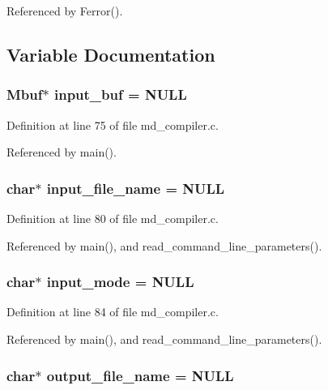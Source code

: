 Referenced by Ferror().

\subsection{Variable Documentation}
\subsubsection{\setlength{\rightskip}{0pt plus 5cm}\bf{Mbuf}$\ast$ \bf{input\_\-buf} = \bf{NULL}}\label{md__compiler_8c_25678326d4f061f5d3e7640b7981d682}




Definition at line 75 of file md\_\-compiler.c.

Referenced by main().
\subsubsection{\setlength{\rightskip}{0pt plus 5cm}char$\ast$ \bf{input\_\-file\_\-name} = \bf{NULL}}\label{md__compiler_8c_a91ff4ee3ee60baee9c097d4da3e3d18}




Definition at line 80 of file md\_\-compiler.c.

Referenced by main(), and read\_\-command\_\-line\_\-parameters().
\subsubsection{\setlength{\rightskip}{0pt plus 5cm}char$\ast$ \bf{input\_\-mode} = \bf{NULL}}\label{md__compiler_8c_f81839da89e889adb517d1fc96a456f9}




Definition at line 84 of file md\_\-compiler.c.

Referenced by main(), and read\_\-command\_\-line\_\-parameters().
\subsubsection{\setlength{\rightskip}{0pt plus 5cm}char$\ast$ \bf{output\_\-file\_\-name} = \bf{NULL}}\label{md__compiler_8c_cdcd0d11bb729145f180d52a0755cddf}




